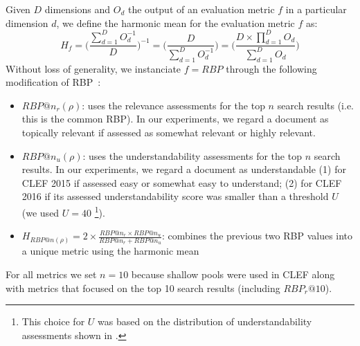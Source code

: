 Given $D$ dimensions and $O_d$ the output of an evaluation metric $f$ in a particular dimension $d$, we define the harmonic mean for the evaluation metric $f$ as:
%
\begin{equation}
%
H_f = \Bigg(\frac{\sum\limits_{d=1}^{D} O_d^{-1} }{D} \Bigg)^{-1} = \Bigg(\frac{D}{\sum\limits_{d=1}^{D} O_d^{-1} } \Bigg) = \Bigg(\frac{ D \times \prod\limits_{d=1}^{D} O_d}{\sum\limits_{d=1}^{D} O_d } \Bigg)
%
\label{eq:RBP}
\end{equation}
%
Without loss of generality, we instanciate $f = RBP$ through the following modification of RBP~\cite{moffat08}:
%
\begin{itemize}[leftmargin=*]
	\item $RBP@n_r(\rho)$: uses the relevance assessments for the top $n$ search results (i.e. this is the common RBP). In our experiments, we regard a document as topically relevant if assessed as somewhat relevant or highly relevant.
%	
    \item $RBP@n_u(\rho)$: uses the understandability assessments for the top $n$ search results. In our experiments, we regard a document as understandable (1) for CLEF 2015 if assessed easy or somewhat easy to understand; (2) for CLEF 2016 if its assessed understandability score was smaller than a threshold $U$ (we used $U = 40$ \footnote{This choice for $U$ was based on the distribution of understandability assessments shown in .}).
%	
    \item $H_{RBP@n(\rho)} = 2 \times \frac{RBP@n_r \times RBP@n_u}{RBP@n_r + RBP@n_u}$: combines the previous two RBP values into a unique metric using the harmonic mean 
\end{itemize}
%
For all metrics we set $n=10$ because shallow pools were used in CLEF along with metrics that focused on the top 10 search results (including $RBP_r@10$).


